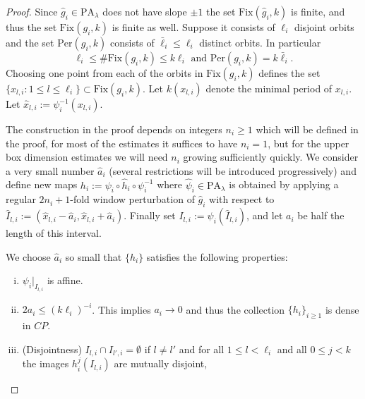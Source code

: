 \documentclass[12pt, a4paper]{amsart}
\def\le{\leqslant}
\def\ge{\geqslant}
\def\per{\mathrm{Per}}
\newcommand{\?}{{\bf ???}}
\newcommand{\fix}{\mathrm{Fix}}
\def\gh{\hat{g}}
\begin{document}
\begin{proof}
Since $\gh_i \in  \mathrm{PA}_{\lambda}$ does not have slope $\pm 1$ the set $\fix(\hat{g}_i,k)$ is finite, and thus the set $\fix(g_i,k)$ is finite as well. Suppose it consists of $\ell_i$ disjoint orbits and  the set $\per(g_i,k)$ consists of $\bar \ell_i \le \ell_i$ distinct orbits.
In particular 
\begin{equation}\label{e-count}
\ell_i \le \# \fix(g_i,k) \le k \ell_i \text{  and  } \per(g_i,k) = k \bar \ell_i.
\end{equation}
Choosing one point  from each of the orbits  in $\fix(g_i,k)$ defines the set
 $\{x_{l,i}: 1 \le l \le \ell_i \} \subset \fix(g_i,k)$.  Let $k(x_{l,i})$ denote the minimal period of $x_{l,i}$.
Let $\hat{x}_{l,i} := \psi_i^{-1}(x_{l,i})$.

The construction in the proof depends on integers $n_i \ge 1$ which will be defined in the proof, for most of the estimates it suffices to have
$n_i =1$, but for the upper box dimension estimates we will need $n_i$ growing sufficiently quickly.
We consider a very small number $\hat a_i$ (several restrictions will be introduced progressively) and define new maps
$h_i := \psi_i \circ \hat{h}_i \circ \psi_i^{-1}$ where $\hat{\psi}_ i\in  \mathrm{PA}_{\lambda}$ is obtained by 
applying a regular $2n_i + 1$-fold window 
perturbation of $\hat{g}_i$ 
with respect to $\hat{I}_{l,i} := 
(\hat{x}_{l,i} - \hat a_i,\hat{x}_{l,i} + \hat a_i)$.
Finally set $I_{l,i} := \psi_i(\hat{I}_{l,i})$, and let $a_i$ be half the length of this interval.

We choose  $\hat a_i$  so small that $\{h_i\}$ satisfies the following properties:
\begin{enumerate}[i)]
\item $\psi_i|_{I_{l,i}}$ is affine.

\item  $2a_{i} \le (k \ell_{i})^{-i}$.\label{p5}
This implies $a_i \to 0$ and thus the collection $\{h_i\}_{i\geq 1}$ is dense in $CP$.

\item (Disjointness) 
$I_{l,i} \cap I_{l',i} = \emptyset$ if $l \ne l'$
and for all $1 \le l < \ell_i $ and all $0 \le j < k$ the
images $h_i^{j} (I_{l,i})$ are mutually disjoint,\label{p1} 


\end{enumerate}
\end{proof}
\end{document}
